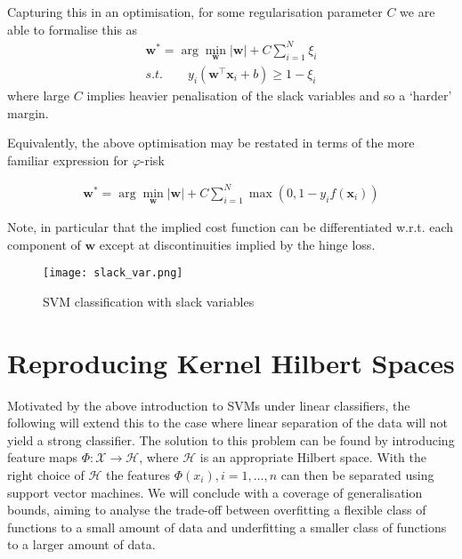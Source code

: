 Capturing this in an optimisation, for some regularisation parameter $C$ we are able to formalise this as
\begin{align}
\mathbf{w}^*=\arg\min_\mathbf{w} |\mathbf{w} |+ C\sum_{i=1}^N\xi_i\\
 s.t. \qquad y_i(\mathbf{w}^\top\mathbf{x}_i+b)\ge1-\xi_i
\end{align}
where large $C$ implies heavier penalisation of the slack variables and so a `harder' margin.

Equivalently, the above optimisation may be restated in terms of the more familiar expression for $\varphi$-risk

\begin{align}
\mathbf{w}^*=\arg\min_\mathbf{w} |\mathbf{w} |+ C\sum_{i=1}^N\max(0,1-y_if(\mathbf{x}_i))
\end{align}

Note, in particular that the implied cost function can be differentiated w.r.t. each component of $\mathbf{w}$ except at discontinuities implied by the hinge loss.

\begin{figure}
\center
\texttt{[image: slack\_var.png]}
\caption{SVM classification with slack variables}
\label{fig:svm_slack}
\end{figure}


%

\section{Reproducing Kernel Hilbert Spaces}

Motivated by the above introduction to SVMs under linear classifiers, the following will extend this to the case where linear separation of the data will not yield a strong classifier. The solution to this problem can be found by introducing feature maps $\Phi\colon \mathcal{X} \rightarrow \mathcal{H}$, where $\mathcal{H}$ is an appropriate Hilbert space. With the right choice of $\mathcal{H}$ the features $\Phi(x_i), i=1, \ldots, n$ can then be separated using support vector machines. We will conclude with a coverage of generalisation bounds, aiming to analyse the trade-off between overfitting a flexible class of functions to a small amount of data and underfitting a smaller class of functions to a larger amount of data. 

